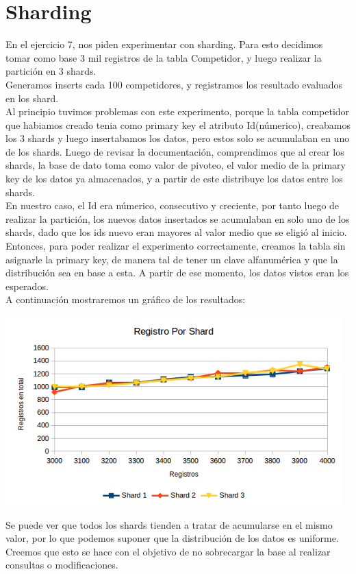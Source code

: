 \section{Sharding}


En el ejercicio 7, nos piden experimentar con sharding.
Para esto decidimos tomar como base 3 mil registros de la tabla Competidor, y luego realizar la partición en 3 shards.\\
Generamos inserts cada 100 competidores, y registramos los resultado evaluados en los shard.\\

Al principio tuvimos problemas con este experimento, porque la tabla competidor que habiamos creado tenia como primary key el atributo Id(númerico), creabamos los 3 shards y luego insertabamos los datos, pero estos solo se acumulaban en uno de los shards. Luego de revisar la documentación, comprendimos que al crear los shards, la base de dato toma como valor de pivoteo, el valor medio de la primary key de los datos ya almacenados, y a partir de este distribuye los datos entre los shards.\\
En nuestro caso, el Id era númerico, consecutivo y creciente, por tanto luego de realizar la partición, los nuevos datos insertados se acumulaban en solo uno de los shards, dado que los ids nuevo eran mayores al valor medio que se eligió al inicio.\\
Entonces, para poder realizar el experimento correctamente, creamos la tabla sin asignarle la primary key, de manera tal de tener un clave alfanumérica y que la distribución sea en base a esta. A partir de ese momento, los datos vistos eran los esperados.\\
A continuación mostraremos un gráfico de los resultados:

\begin{center}
\includegraphics[width=13cm,keepaspectratio]{./imagenes/shard.png}\newline
\end{center}

Se puede ver que todos los shards tienden a tratar de acumularse en el mismo valor, por lo que podemos suponer que la distribución de los datos es uniforme. Creemos que esto se hace con el objetivo de no sobrecargar la base al realizar consultas o modificaciones.